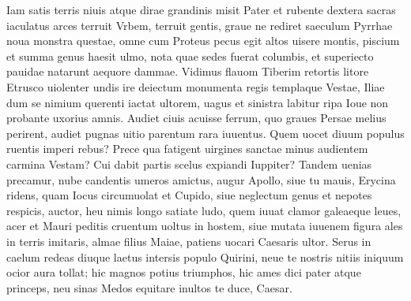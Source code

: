\documentclass{book}
\newenvironment {carmen} [1] [\relax] 
  {\Titulus \Versus \incipit*\numerus{1}#1}
  {\endVersus}
\newcommand {\Sapphic}   {\Forma \strophae {0 \poena 00 \poena 1}}
\begin{document}
\begin{carmen}[\Sapphic]

 Iam satis terris niuis atque dirae
 grandinis misit Pater et rubente
 dextera sacras iaculatus arces
      terruit Vrbem,
 terruit gentis, graue ne rediret               
 saeculum Pyrrhae noua monstra questae,
 omne cum Proteus pecus egit altos
      uisere montis,
 piscium et summa genus haesit ulmo,
 nota quae sedes fuerat columbis,               
 et superiecto pauidae natarunt
       aequore dammae.
 Vidimus flauom Tiberim retortis
 litore Etrusco uiolenter undis
 ire deiectum monumenta regis               
      templaque Vestae,
 Iliae dum se nimium querenti
 iactat ultorem, uagus et sinistra
 labitur ripa Ioue non probante
      uxorius amnis.               
 Audiet ciuis acuisse ferrum,
 quo graues Persae melius perirent,
 audiet pugnas uitio parentum
      rara iuuentus.
 Quem uocet diuum populus ruentis               
 imperi rebus? Prece qua fatigent
 uirgines sanctae minus audientem
      carmina Vestam?
 Cui dabit partis scelus expiandi
 Iuppiter? Tandem uenias precamur,               
 nube candentis umeros amictus,
      augur Apollo,
 siue tu mauis, Erycina ridens,
 quam Iocus circumuolat et Cupido,
 siue neglectum genus et nepotes               
      respicis, auctor,
 heu nimis longo satiate ludo,
 quem iuuat clamor galeaeque leues,
 acer et Mauri peditis cruentum
       uoltus in hostem,               
 siue mutata iuuenem figura
 ales in terris imitaris, almae
 filius Maiae, patiens uocari
      Caesaris ultor.
 Serus in caelum redeas diuque               
 laetus intersis populo Quirini,
 neue te nostris nitiis iniquum
      ocior aura
 tollat; hic magnos potius triumphos,
 hic ames dici pater atque princeps,               
 neu sinas Medos equitare inultos
      te duce, Caesar. 
\end{carmen}
\end{document}
